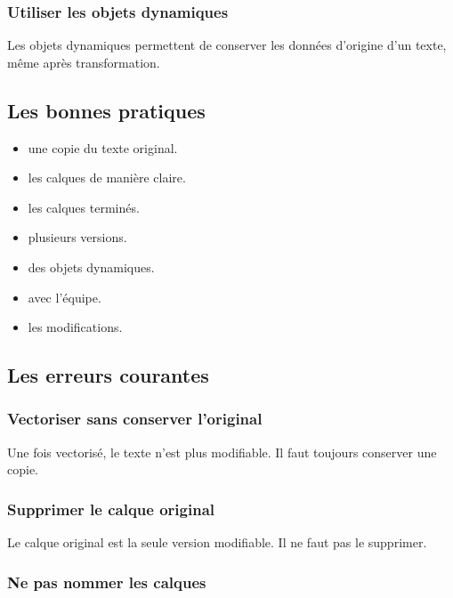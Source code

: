 \subsubsection{Utiliser les objets dynamiques}

Les objets dynamiques permettent de conserver les données d'origine d'un texte, même après transformation.

\subsection{Les bonnes pratiques}

\begin{itemize}
    \item {} une copie du texte original.
    \item {} les calques de manière claire.
    \item {} les calques terminés.
    \item {} plusieurs versions.
    \item {} des objets dynamiques.
    \item {} avec l'équipe.
    \item {} les modifications.
\end{itemize}

\subsection{Les erreurs courantes}

\subsubsection{Vectoriser sans conserver l'original}

Une fois vectorisé, le texte n'est plus modifiable. Il faut toujours conserver une copie.

\subsubsection{Supprimer le calque original}

Le calque original est la seule version modifiable. Il ne faut pas le supprimer.

\subsubsection{Ne pas nommer les calques}

